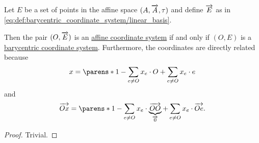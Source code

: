 \begin{proposition}\label{thm:affine_and_barycentric_coordinate_systems}
  Let \( E \) be a set of points in the affine space \( (A, \overrightarrow{A}, \tau) \) and define \( \overrightarrow{E} \) as in \eqref{eq:def:barycentric_coordinate_system/linear_basis}.

  Then the pair \( (O, \overrightarrow{E}) \) is an \hyperref[def:affine_coordinate_system]{affine coordinate system} if and only if \( (O, E) \) is a \hyperref[def:barycentric_coordinate_system]{barycentric coordinate system}. Furthermore, the coordinates are directly related because
  \begin{equation*}
    x = \parens*{ 1 - \sum_{e \neq O} x_e } \cdot O + \sum_{e \neq O} x_e \cdot e
  \end{equation*}
  and
  \begin{equation*}
    \vect{Ox} = \parens*{ 1 - \sum_{e \neq O} x_e } \cdot \underbrace{\vect{OO}}_{\vect 0} + \sum_{e \neq O} x_e \cdot \vect{Oe}.
  \end{equation*}
\end{proposition}
\begin{proof}
  Trivial.
\end{proof}

